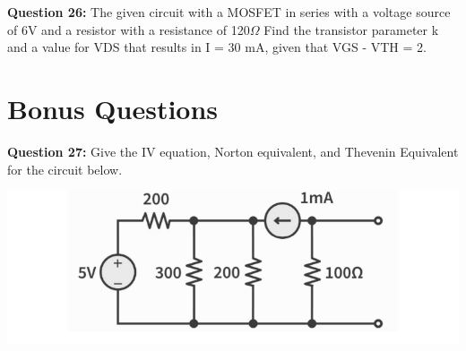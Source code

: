 \documentclass{article}
\begin{document}
\textbf{Question 26:} The given circuit with a MOSFET in series with a voltage source of 6V and a resistor with a resistance of 120\(\Omega\)
Find the transistor parameter k and a value for VDS that results in I = 30 mA, given that VGS - VTH = 2.

\section*{Bonus Questions}

\textbf{Question 27:} Give the IV equation, Norton equivalent, and Thevenin Equivalent for the circuit below.

\begin{center}

    \includegraphics[width=0.75\linewidth]{figures/99.png}
\end{center}
\end{document}
